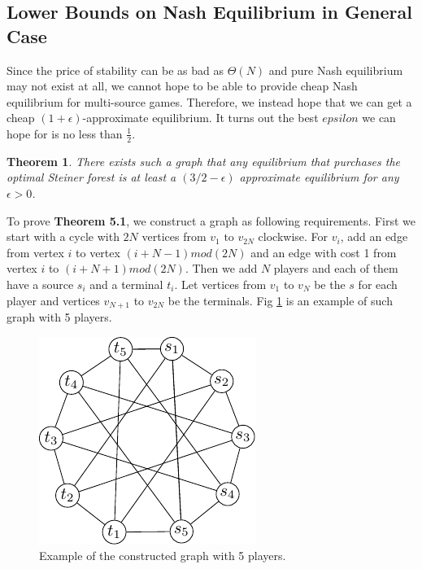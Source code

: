 \documentclass[11pt,psfig,times]{article}
\newtheorem{theorem}{Theorem}[section]
\begin{document}
	\subsection{Lower Bounds on Nash Equilibrium in General Case}
	Since the price of stability can be as bad as $\Theta(N)$ and pure Nash equilibrium may not exist at all, we cannot hope to be able to provide cheap Nash equilibrium for multi-source games. Therefore, we instead hope that we can get a cheap $(1+\epsilon)$-approximate equilibrium. It turns out the best $epsilon$ we can hope for is no less than $\frac{1}{2}$.

	\begin{theorem}
		There exists such a graph that any equilibrium that purchases the optimal Steiner forest is at least a $(3/2-\epsilon)$ approximate equilibrium for any $\epsilon > 0$.
	\end{theorem}
	
	To prove \textbf{Theorem 5.1}, we construct a graph as following requirements. First we start with a cycle with $2N$ vertices from $v_1 \text{ to } v_{2N}$ clockwise. For $v_i$, add an edge from vertex $i$ to vertex $(i+N-1)mod (2N)$ and an edge with cost 1 from vertex $i$ to $(i+N+1)mod (2N)$. Then we add $N$ players and each of them have a source $s_i$ and a terminal $t_i$. Let vertices from $v_1$ to $v_N$ be the $s$ for each player and vertices $v_{N+1}$ to $v_{2N}$ be the terminals.	Fig \ref{fig:generalgame} is an example of such graph with 5 players.
			   
	\begin{figure}[H]
		\begin{center}
			\includegraphics{pictures/generalcase.pdf}
		\end{center}
		\caption{ Example of the constructed graph with 5 players.}
		\label{fig:generalgame}
	\end{figure}
\end{document}

